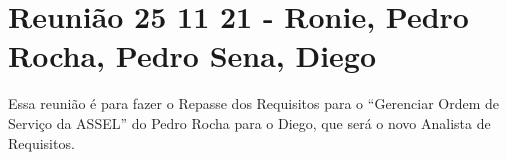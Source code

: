 \section{Reunião 25 11 21 - Ronie, Pedro Rocha, Pedro Sena, Diego}

Essa reunião é para fazer o Repasse dos Requisitos para o ``Gerenciar Ordem de Serviço da ASSEL'' do Pedro Rocha para o Diego, que será o novo Analista de Requisitos.